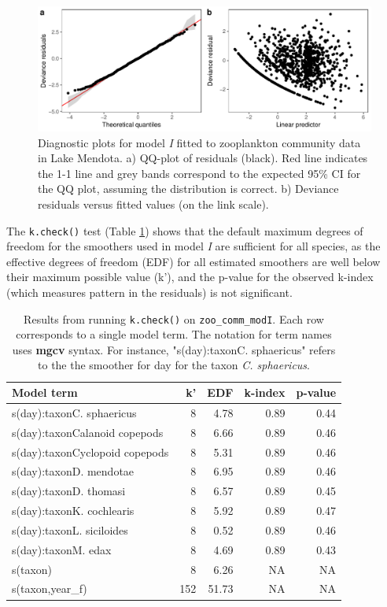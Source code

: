 \documentclass[12pt]{article}
\begin{document}
\begin{figure}
\centering
\includegraphics{../figures/zoo_comm_diag-1.pdf}
\caption{\label{fig:zoo_comm_diag_plot} Diagnostic plots for model
\emph{I} fitted to zooplankton community data in Lake Mendota. a)
QQ-plot of residuals (black). Red line indicates the 1-1 line and grey
bands correspond to the expected 95\% CI for the QQ plot, assuming the
distribution is correct. b) Deviance residuals versus fitted values (on
the link scale).}
\end{figure}

The \texttt{k.check()} test (Table \ref{tab:zoo_comm_check_k_kable})
shows that the default maximum degrees of freedom for the smoothers used
in model \emph{I} are sufficient for all species, as the effective
degrees of freedom (EDF) for all estimated smoothers are well below
their maximum possible value (k'), and the p-value for the observed
k-index (which measures pattern in the residuals) is not significant.

\begin{table}[t]

\caption{\label{tab:zoo_comm_check_k_kable}Results from running \texttt{k.check()} on \texttt{zoo\_comm\_modI}. Each row corresponds to a single model term. The notation for term names uses \textbf{mgcv} syntax. For instance, "s(day):taxonC. sphaericus" refers to the the smoother for day for the taxon \textit{C. sphaericus}.}
\centering
\begin{tabular}{lrrrr}
\toprule
Model term & k' & EDF & k-index & p-value\\
\midrule
s(day):taxonC. sphaericus & 8 & 4.78 & 0.89 & 0.44\\
s(day):taxonCalanoid copepods & 8 & 6.66 & 0.89 & 0.46\\
s(day):taxonCyclopoid copepods & 8 & 5.31 & 0.89 & 0.46\\
s(day):taxonD. mendotae & 8 & 6.95 & 0.89 & 0.46\\
s(day):taxonD. thomasi & 8 & 6.57 & 0.89 & 0.45\\
\addlinespace
s(day):taxonK. cochlearis & 8 & 5.92 & 0.89 & 0.47\\
s(day):taxonL. siciloides & 8 & 0.52 & 0.89 & 0.46\\
s(day):taxonM. edax & 8 & 4.69 & 0.89 & 0.43\\
s(taxon) & 8 & 6.26 & NA & NA\\
s(taxon,year\_f) & 152 & 51.73 & NA & NA\\
\bottomrule
\end{tabular}
\end{table}
\end{document}
